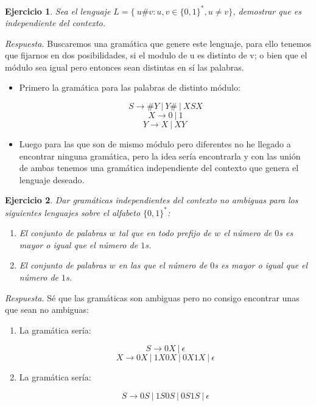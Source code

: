 \documentclass[11pt]{article}
\theoremstyle{ejercicio-style}
\newtheorem{ejer}{Ejercicio}
\begin{document}
\newpage
\begin{ejer}
Sea el lenguaje $L = \{ \ u\#v : u,v \in \{0,1\}^*, u \neq v \} $, demostrar que es independiente del contexto.
\end{ejer}

\emph{Respuesta.} Buscaremos una gramática que genere este lenguaje, para ello tenemos que fijarnos en dos posibilidades, si el modulo de u es distinto de v; o bien que el módulo sea igual pero entonces sean distintas en sí las palabras.

\begin{itemize}
\item Primero la gramática para las palabras de distinto módulo:

$$ S \rightarrow \#Y \ | \ Y\# \ | \ XSX $$
$$ X \rightarrow 0 \ | \ 1 $$
$$ Y \rightarrow X \ | \ XY \ $$

\item Luego para las que son de mismo módulo pero diferentes no he llegado a encontrar ninguna gramática, pero la idea sería encontrarla y con las unión de ambas tenemos una gramática independiente del contexto que genera el lenguaje deseado.
\end{itemize}


\newpage

\begin{ejer}
	Dar gramáticas independientes del contexto no ambiguas para los siguientes lenguajes sobre el alfabeto $\{0,1\}^*$:
	\begin{enumerate}
		\item El conjunto de palabras $w$ tal que en todo prefijo de $w$ el número de $0$s es mayor o igual que el número de $1$s.
		\item El conjunto de palabras $w$ en las que el número de $0$s es mayor o igual que el número de $1$s.
	\end{enumerate}
\end{ejer}

\emph{Respuesta.} Sé que las gramáticas son ambiguas pero no consigo encontrar unas que sean no ambiguas:
\begin{enumerate}
	\item La gramática sería:
	
	$$ S \rightarrow 0X \ | \ \epsilon $$
	$$ X \rightarrow 0X \ | \ 1X0X \ | \ 0X1X \ | \ \epsilon $$
	
	\item La gramática sería:
	
	$$ S \rightarrow 0S \ | \ 1S0S \ | \ 0S1S \ | \ \epsilon $$
\end{enumerate}
\end{document}
